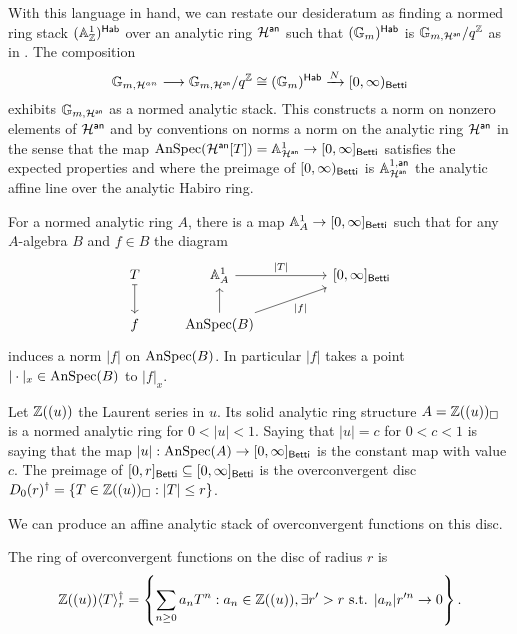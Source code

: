 With this language in hand, we can restate our desideratum as finding a normed ring stack $(\mathbb{A}^{1}_{\mathbb{Z}})^{\mathsf{Hab}}$ over an analytic ring $\mathcal{H}^{\mathsf{an}}$ such that $(\mathbb{G}_{m})^{\mathsf{Hab}}$ is $\mathbb{G}_{m,\mathcal{H}^{\mathsf{an}}}/q^{\mathbb{Z}}$ as in . The composition 
$$\mathbb{G}_{m,\mathcal{H}^{an}}\longrightarrow\mathbb{G}_{m,\mathcal{H}^{\mathsf{an}}}/q^{\mathbb{Z}}\cong(\mathbb{G}_{m})^{\mathsf{Hab}}\xrightarrow{N}[0,\infty)_{\mathsf{Betti}}$$
exhibits $\mathbb{G}_{m,\mathcal{H}^{\mathsf{an}}}$ as a normed analytic stack. This constructs a norm on nonzero elements of $\mathcal{H}^{\mathsf{an}}$ and by conventions on norms a norm on the analytic ring $\mathcal{H}^{\mathsf{an}}$ in the sense that the map $\mathrm{AnSpec}(\mathcal{H}^{\mathsf{an}}[T])=\mathbb{A}^{1}_{\mathcal{H}^{\mathsf{an}}}\to[0,\infty]_{\mathsf{Betti}}$ satisfies the expected properties and where the preimage of $[0,\infty)_{\mathsf{Betti}}$ is $\mathbb{A}^{1,\mathsf{an}}_{\mathcal{H}^{\mathsf{an}}}$ the analytic affine line over the analytic Habiro ring. 
\begin{example}
    For a normed analytic ring $A$, there is a map $\mathbb{A}^{1}_{A}\to[0,\infty]_{\mathsf{Betti}}$ such that for any $A$-algebra $B$ and $f\in B$ the diagram 
    $$%
    \begin{tikzcd}
        T & {\A^{1}_{A}} && {[0,\infty]_{\Betti}} \\
        f & {\AnSpec(B)}
        \arrow[maps to, from=1-1, to=2-1]
        \arrow["{|T|}", from=1-2, to=1-4]
        \arrow[from=2-2, to=1-2]
        \arrow["{|f|}"', from=2-2, to=1-4]
    \end{tikzcd}$$
    induces a norm $|f|$ on $\mathrm{AnSpec}(B)$. In particular $|f|$ takes a point $|\cdot|_{x}\in\mathrm{AnSpec}(B)$ to $|f|_{x}$.  
\end{example}
\begin{example}
    Let $\mathbb{Z}((u))$ the Laurent series in $u$. Its solid analytic ring structure $A=\mathbb{Z}((u))_{\square}$ is a normed analytic ring for $0<|u|<1$. Saying that $|u|=c$ for $0<c<1$ is saying that the map $|u|:\mathrm{AnSpec}(A)\to[0,\infty]_{\mathsf{Betti}}$ is the constant map with value $c$. The preimage of $[0,r]_{\mathsf{Betti}}\subseteq[0,\infty]_{\mathsf{Betti}}$ is the overconvergent disc $D_{0}(r)^{\dagger}=\{T\in\mathbb{Z}((u))_{\square}:|T|\leq r\}$.
\end{example}
We can produce an affine analytic stack of overconvergent functions on this disc. 
\begin{definition}\label{def: overconvergent functions on the disc}
    The ring of overconvergent functions on the disc of radius $r$ is 
    $$\mathbb{Z}((u))\langle T\rangle_{r}^{\dagger}=\left\{\sum_{n\geq0}a_{n}T^{n}:a_{n}\in\mathbb{Z}((u)),\exists r'>r\text{ s.t. }|a_{n}|r'^{n}\to0\right\}.$$
\end{definition}
